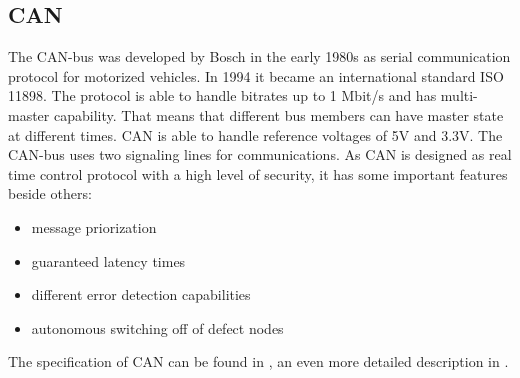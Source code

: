 \subsection{CAN}
The CAN-bus was developed by Bosch in the early 1980s as serial communication protocol for motorized vehicles. In 1994 it became an international standard ISO 11898. The protocol is able to handle bitrates up to 1 Mbit/s and has multi-master capability. That means that different bus members can have master state at different times. CAN is able to handle reference voltages of 5V and 3.3V.\cite{Corrig2008} The CAN-bus uses two signaling lines for communications. As CAN is designed as real time control protocol with a high level of security, it has some important features beside others\cite{boschcan91}:
\begin{itemize}
\item message priorization
\item guaranteed latency times
\item different error detection capabilities
\item autonomous switching off of defect nodes
\end{itemize}
The specification of CAN can be found in \cite{boschcan91}, an even more detailed description in \cite{nxpcan98}.
